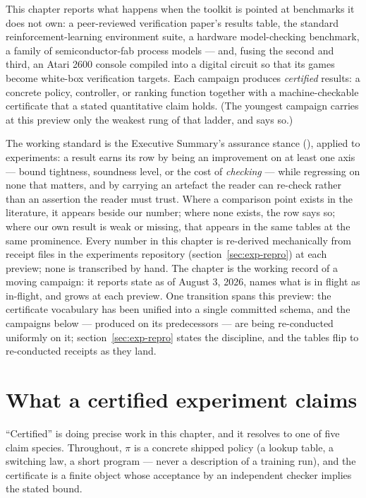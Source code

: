 This chapter reports what happens when the toolkit is pointed at
benchmarks it does not own: a peer-reviewed verification paper's results
table, the standard reinforcement-learning environment suite, a hardware
model-checking benchmark, a family of semiconductor-fab process models
--- and, fusing the second and third, an Atari 2600 console compiled
into a digital circuit so that its games become white-box verification
targets. Each campaign produces \emph{certified} results: a concrete
policy, controller, or ranking function together with a
machine-checkable certificate that a stated quantitative claim holds.
(The youngest campaign carries at this preview only the weakest rung
of that ladder, and says so.)

The working standard is the Executive Summary's assurance stance
(), applied to
experiments: a result earns its row by being an improvement on at least
one axis --- bound tightness, soundness level, or the cost of
\emph{checking} --- while regressing on none that matters, and by
carrying an artefact the reader can re-check rather than an assertion
the reader must trust. Where a comparison point exists in the
literature, it appears beside our number; where none exists, the row
says so; where our own result is weak or missing, that appears in the
same tables at the same prominence. Every number in this chapter is
re-derived mechanically from receipt files in the experiments
repository (section~\ref{sec:exp-repro}) at each preview; none is
transcribed by hand. The chapter is the working record of a moving
campaign: it reports state as of August 3, 2026, names what is in
flight as in-flight, and grows at each preview. One transition spans
this preview: the certificate vocabulary has been unified into a
single committed schema, and the campaigns below --- produced on its
predecessors --- are being re-conducted uniformly on it;
section~\ref{sec:exp-repro} states the discipline, and the tables
flip to re-conducted receipts as they land.

\section{What a certified experiment claims}
\label{sec:exp-claims}

``Certified'' is doing precise work in this chapter, and it resolves to
one of five claim species. Throughout, $\pi$ is a concrete shipped
policy (a lookup table, a switching law, a short program --- never a
description of a training run), and the certificate is a finite object
whose acceptance by an independent checker implies the stated bound.

